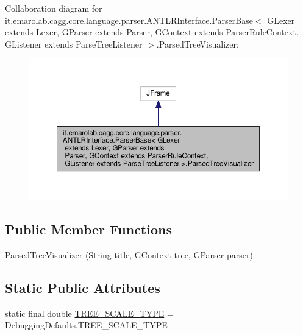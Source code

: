 Collaboration diagram for it.\-emarolab.\-cagg.\-core.\-language.\-parser.\-A\-N\-T\-L\-R\-Interface.\-Parser\-Base$<$ G\-Lexer extends Lexer, G\-Parser extends Parser, G\-Context extends Parser\-Rule\-Context, G\-Listener extends Parse\-Tree\-Listener $>$.Parsed\-Tree\-Visualizer\-:\nopagebreak
\begin{figure}[H]
\begin{center}
\leavevmode
\includegraphics[width=350pt]{classit_1_1emarolab_1_1cagg_1_1core_1_1language_1_1parser_1_1ANTLRInterface_1_1ParserBase_3_01GL20ad32ef7d9d35e66c63bd19a762d035}
\end{center}
\end{figure}
\subsection*{Public Member Functions}
\begin{DoxyCompactItemize}
\item 
\hyperlink{classit_1_1emarolab_1_1cagg_1_1core_1_1language_1_1parser_1_1ANTLRInterface_1_1ParserBase_3_01GL87e2703206e8c51ae32fa157d66066a1_a8881350064d1ed5705a46ae897341da9}{Parsed\-Tree\-Visualizer} (String title, G\-Context \hyperlink{classit_1_1emarolab_1_1cagg_1_1core_1_1language_1_1parser_1_1ANTLRInterface_1_1ParserBase_3_01GL50c14717389f32c0d6ed45a3d8ee0386_a936b8bb0feaf17dc30550a3deb796faa}{tree}, G\-Parser \hyperlink{classit_1_1emarolab_1_1cagg_1_1core_1_1language_1_1parser_1_1ANTLRInterface_1_1ParserBase_3_01GL50c14717389f32c0d6ed45a3d8ee0386_a3298e4eaf5cfd7ac7bbd6b5edeab5954}{parser})
\end{DoxyCompactItemize}
\subsection*{Static Public Attributes}
\begin{DoxyCompactItemize}
\item 
static final double \hyperlink{classit_1_1emarolab_1_1cagg_1_1core_1_1language_1_1parser_1_1ANTLRInterface_1_1ParserBase_3_01GL87e2703206e8c51ae32fa157d66066a1_a8873f36f4adc59fac546924e6f64296f}{T\-R\-E\-E\-\_\-\-S\-C\-A\-L\-E\-\_\-\-T\-Y\-P\-E} = Debugging\-Defaults.\-T\-R\-E\-E\-\_\-\-S\-C\-A\-L\-E\-\_\-\-T\-Y\-P\-E
\end{DoxyCompactItemize}



